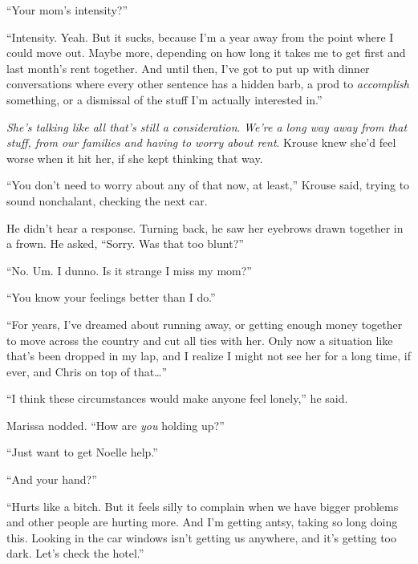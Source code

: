 ``Your mom's intensity?''



``Intensity.  Yeah.  But it sucks, because I'm a year away from the point where I could move out.  Maybe more, depending on how long it takes me to get first and last month's rent together.  And until then, I've got to put up with dinner conversations where every other sentence has a hidden barb, a prod to \emph{accomplish} something, or a dismissal of the stuff I'm actually interested in.''



\emph{She's talking like all that's still a consideration}.  \emph{We're a long way away from that stuff, from our families and having to worry about rent}.  Krouse knew she'd feel worse when it hit her, if she kept thinking that way.



``You don't need to worry about any of that now, at least,'' Krouse said, trying to sound nonchalant, checking the next car.



He didn't hear a response.  Turning back, he saw her eyebrows drawn together in a frown.  He asked, ``Sorry.  Was that too blunt?''



``No.  Um.  I dunno.  Is it strange I miss my mom?''



``You know your feelings better than I do.''



``For years, I've dreamed about running away, or getting enough money together to move across the country and cut all ties with her.  Only now a situation like that's been dropped in my lap, and I realize I might not see her for a long time, if ever, and Chris on top of that\ldots''



``I think these circumstances would make anyone feel lonely,'' he said.



Marissa nodded.  ``How are \emph{you} holding up?''



``Just want to get Noelle help.''



``And your hand?''



``Hurts like a bitch.  But it feels silly to complain when we have bigger problems and other people are hurting more.  And I'm getting antsy, taking so long doing this.  Looking in the car windows isn't getting us anywhere, and it's getting too dark.  Let's check the hotel.''



